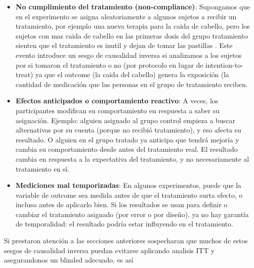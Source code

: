 \documentclass[
  letterpaper,
  DIV=11,
  numbers=noendperiod,
  oneside]{scrreprt}
\begin{document}
\begin{itemize}
\item
  \textbf{No cumplimiento del tratamiento (non-compliance)}: Supongamos
  que en el experimento se asigna aleatoriamente a algunos sujetos a
  recibir un tratamiento, por ejemplo una nueva terapia para la caida de
  cabello, pero los sujetos con mas caida de cabello en las primeras
  dosis del grupo tratamiento sienten que el tratamiento es inutil y
  dejan de tomar las pastillas . Este evento introduce un sesgo de
  causalidad inversa si analizamos a los sujetos por si tomaron el
  tratamiento o no (por protocolo en lugar de intention-to-treat) ya que
  el outcome (la caida del cabello) genera la exposición (la cantidad de
  medicación que las personas en el grupo de tratamiento reciben.
\item
  \textbf{Efectos anticipados o comportamiento reactivo}: A veces, los
  participantes modifican su comportamiento en respuesta a saber su
  asignación. Ejemplo: alguien asignado al grupo control empieza a
  buscar alternativas por su cuenta (porque no recibió tratamiento), y
  eso afecta su resultado. O alguien en el grupo tratado ya anticipa que
  tendrá mejoría y cambia su comportamiento desde antes del tratamiento
  real. El resultado cambia en respuesta a la expectativa del
  tratamiento, y no necesariamente al tratamiento en sí.
\item
  \textbf{Mediciones mal temporizadas}: En algunos experimentos, puede
  que la variable de outcome sea medida antes de que el tratamiento
  surta efecto, o incluso antes de aplicarlo bien. Si los resultados se
  usan para definir o cambiar el tratamiento asignado (por error o por
  diseño), ya no hay garantía de temporalidad: el resultado podría estar
  influyendo en el tratamiento.
\end{itemize}

\begin{tcolorbox}[enhanced jigsaw, breakable, rightrule=.15mm, colbacktitle=quarto-callout-warning-color!10!white, bottomtitle=1mm, arc=.35mm, titlerule=0mm, left=2mm, toprule=.15mm, leftrule=.75mm, colback=white, opacitybacktitle=0.6, opacityback=0, colframe=quarto-callout-warning-color-frame, bottomrule=.15mm, coltitle=black, toptitle=1mm, title={Advertencia}]
Si prestaron atención a las secciones anteriores sospecharan que muchos
de estos sesgos de causalidad inversa puedan evitarse aplicando analisis
ITT y asegurandonos un blinded adecuado, es así
\end{tcolorbox}
\end{document}
